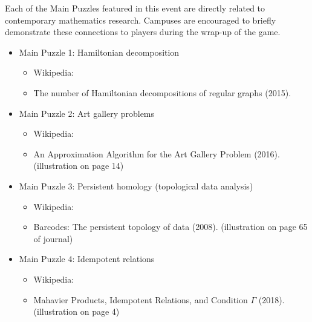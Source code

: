 Each of the Main Puzzles featured in this event are directly related
to contemporary mathematics research. Campuses are encouraged to briefly
demonstrate these connections to players during the wrap-up of the game.

\begin{itemize}
\item Main Puzzle 1: Hamiltonian decomposition
\begin{itemize}
\item Wikipedia: 
\item The number of Hamiltonian decompositions of regular graphs (2015). 
\end{itemize}
\item Main Puzzle 2: Art gallery problems 
\begin{itemize}
\item Wikipedia: 
\item An Approximation Algorithm for the Art Gallery Problem (2016). 
      (illustration on page 14)
\end{itemize}
\item Main Puzzle 3: Persistent homology (topological data analysis) 
\begin{itemize}
\item Wikipedia: 
\item Barcodes: The persistent topology of data (2008). 
      (illustration on page 65 of journal)
\end{itemize}
\item Main Puzzle 4: Idempotent relations 
\begin{itemize}
\item Wikipedia: 
\item Mahavier Products, Idempotent Relations, and Condition \(\Gamma\) (2018). 
      (illustration on page 4)
\end{itemize}
\end{itemize}
